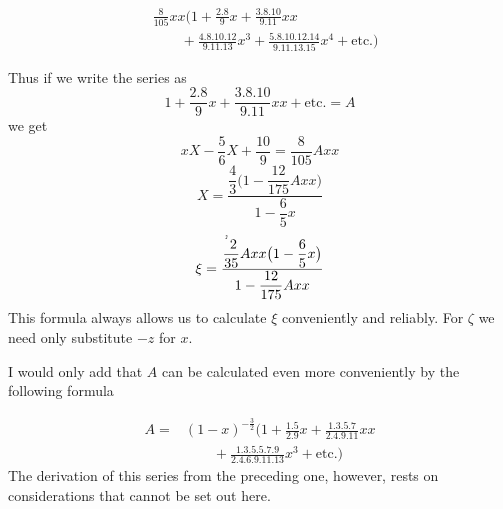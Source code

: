 \[
\begin{aligned}
&\frac{8}{105}xx\bigl(1+\frac{2\mathord{.}8}{9}x+\frac{3\mathord{.}8\mathord{.}10}{9\mathord{.}11}xx\\
&\qquad+\frac{4\mathord{.}8\mathord{.}10\mathord{.}12}{9\mathord{.}11\mathord{.}13}x^3+\frac{5\mathord{.}8\mathord{.}10\mathord{.}12\mathord{.}14}{9\mathord{.}11\mathord{.}13\mathord{.}15}x^4+\text{etc.}\bigr)
\end{aligned}
\]
\par\indent Thus if we write the series as
\[
1+\frac{2\mathord{.}8}{9}x+\frac{3\mathord{.}8\mathord{.}10}{9\mathord{.}11}xx+\text{etc.}=A
\]
\noindent we get
\[
xX-\frac{5}{6}X+\frac{10}{9}=\frac{8}{105}Axx
\]
\[
X=\frac{\dfrac{4}{3}\bigl(1-\dfrac{12}{175}Axx\bigr)}{1-\dfrac{6}{5}x}
\]
\[
\xi=\frac{\dfrac{\mathord{\raisebox{7bp}{\ObservedNumeratorMark}\,}2}{35}Axx\bigl(1-\dfrac{6}{5}x\bigr)}{1-\dfrac{12}{175}Axx}
\]
\noindent This formula always allows us to calculate $\xi$ conveniently and reliably. For $\zeta$ we need only substitute $-z$ for $x$.

\par\indent I would only add that $A$ can be calculated even more conveniently by the following formula

\[
\begin{aligned}
A={}&(1-x)^{-\frac{3}{2}}\bigl(1+\frac{1\mathord{.}5}{2\mathord{.}9}x+\frac{1\mathord{.}3\mathord{.}5\mathord{.}7}{2\mathord{.}4\mathord{.}9\mathord{.}11}xx\\
&\qquad+\frac{1\mathord{.}3\mathord{.}5\mathord{.}5\mathord{.}7\mathord{.}9}{2\mathord{.}4\mathord{.}6\mathord{.}9\mathord{.}11\mathord{.}13}x^3+\text{etc.}\bigr)
\end{aligned}
\]
\noindent The derivation of this series from the preceding one, however, rests on considerations that cannot be set out here.
